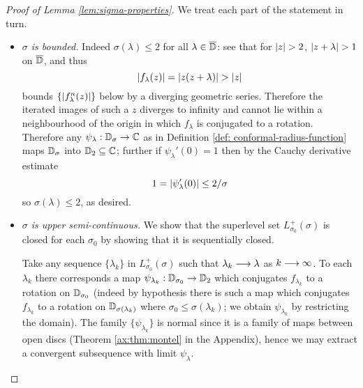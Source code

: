 \documentclass[../main.tex]{subfiles}
\begin{document}
\begin{proof}[Proof of Lemma \ref{lem:sigma-properties}]
We treat each part of the statement in turn.
\begin{itemize}
    \item \textit{$\sigma$ is bounded.} Indeed $\sigma(\lambda) \le 2$ for all $\lambda \in \overline{\mathbb{D}}$: see that for $\left|z\right| > 2$, $\left|z + \lambda\right| > 1$ on $\overline{\mathbb{D}}$, and thus
    \[
        \left|f_\lambda(z)\right| = \left|z(z + \lambda)\right| > \left|z\right|
    \]
    bounds $\{\left|f^n_\lambda(z)\right|\}$ below by a diverging geometric series. Therefore the iterated images of such a $z$ diverges to infinity and cannot lie within a neighbourhood of the origin in which $f_\lambda$ is conjugated to a rotation. Therefore any $\psi_\lambda : \mathbb{D}_\sigma \to \mathbb{C}$ as in Definition \ref{def: conformal-radius-function} maps $\mathbb{D}_\sigma$ into $\mathbb{D}_2 \subseteq \mathbb{C}$; further if $\psi_\lambda'(0) = 1$ then by the Cauchy derivative estimate
    \[
    1 = \left|\psi_\lambda'(0)\right| \le 2/\sigma
    \]
    so $\sigma(\lambda) \le 2$, as desired.

    \item \textit{$\sigma$ is upper semi-continuous.} We show that the superlevel set $L_{\sigma_0}^+(\sigma)$ is closed for each $\sigma_0$ by showing that it is sequentially closed.
    
    Take any sequence $\{\lambda_k\}$ in $L_{\sigma_0}^+(\sigma)$ such that $\lambda_k \longrightarrow \lambda$ as $k \longrightarrow \infty$. To each $\lambda_k$ there corresponds a map $\psi_{\lambda_k} : \mathbb{D}_{\sigma_0} \to \mathbb{D}_2$ which conjugates $f_{\lambda_k}$ to a rotation on $\mathbb{D}_{\sigma_0}$ (indeed by hypothesis there is such a map which conjugates $f_{\lambda_k}$ to a rotation on $\mathbb{D}_{\sigma(\lambda_k)}$ where $\sigma_0 \le \sigma(\lambda_k)$; we obtain $\psi_{\lambda_k}$ by restricting the domain). The family $\{\psi_{\lambda_k}\}$ is normal since it is a family of maps between open discs (Theorem \ref{ax:thm:montel} in the Appendix), hence we may extract a convergent subsequence with limit $\psi_\lambda$.
    

\end{itemize}
\end{proof}
\end{document}
